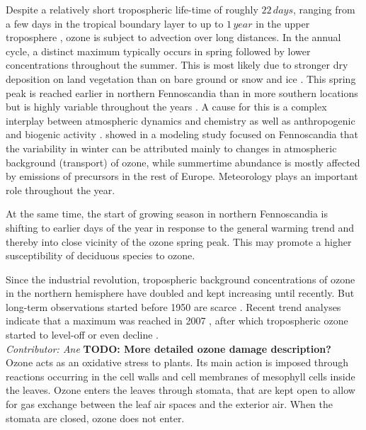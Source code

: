\documentclass[bg, manuscript]{copernicus}
\begin{document}
Despite a relatively short tropospheric life-time of roughly $22\,\unit{days}$, ranging from a few days in the tropical boundary layer to up to $1\,\unit{year}$ in the upper troposphere \citep{JGR:Stevenson2005,ACP:Young2013}, ozone is subject to advection over long distances.
In the annual cycle, a distinct maximum typically occurs in spring followed by lower concentrations throughout the summer. This is most likely due to stronger dry deposition on land vegetation than on bare ground or snow and ice \citep{AE:Monks2000}. This spring peak is reached earlier in northern Fennoscandia than in more southern locations but is highly variable throughout the years \citep{AB:Klingberg2009, BER:Klingberg2019}. A cause for this is a complex interplay between atmospheric dynamics and chemistry \citep{AE:Laurila1996,BER:Hatakka2003} as well as anthropogenic and biogenic activity \citep{AE:Rummukainen1996,AE:Simpson2002,QJRMS:Galbally2007,NGS:Schnell2009}. \citet{ACP:Andersson2017} showed in a modeling study focused on Fennoscandia that the variability in winter can be attributed mainly to changes in atmospheric background (transport) of ozone, while summertime abundance is mostly affected by emissions of precursors in the rest of Europe. Meteorology plays an important role throughout the year.

At the same time, the start of growing season in northern Fennoscandia is shifting to earlier days of the year in response to the general warming trend \citep[e.g.,]{GCB:Menzel2006,RS:Hogda2013,IJB:Karlsen2007} and thereby into close vicinity of the ozone spring peak. This may promote a higher susceptibility of deciduous species to ozone.

Since the industrial revolution, tropospheric background concentrations of ozone in the northern hemisphere have doubled and kept increasing until recently. But long-term observations started before 1950 are scarce \citep[Chapter 2]{IPCC2013}. Recent trend analyses indicate that a maximum was reached in 2007 \citep{AE:Derwent2018}, after which tropospheric ozone started to level-off or even decline \citep{ACP:Wespes2018,ESA:Gaudel2018}.\\

\emph{Contributor: Ane} {\bf TODO: More detailed ozone damage description?}\\
Ozone acts as an oxidative stress to plants. Its main action is imposed through reactions occurring in the cell walls and cell membranes of mesophyll cells inside the leaves. Ozone enters the leaves through stomata, that are kept open to allow for gas exchange between the leaf air spaces and the exterior air. When the stomata are closed, ozone does not enter.
\end{document}

